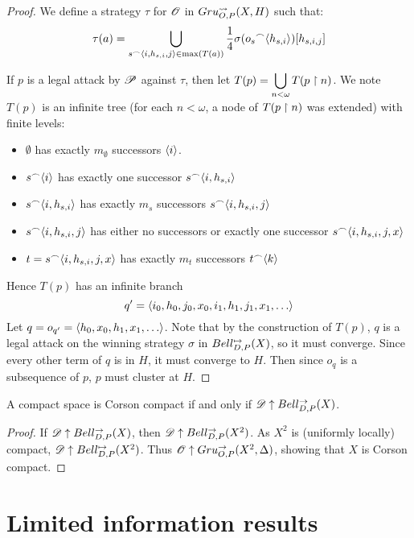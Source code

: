 \begin{proof}
  We define a strategy $\tau$ for $\mathscr{O}$ in $Gru_{O,P}^{\leadsto}(X,H)$ such
  that:
  \[
    \tau(a)
      =
    \bigcup_{s{^\frown}\langle i,h_{s,i},j\rangle\in\max(T(a))}
    \frac{1}{4}\sigma(o_s{^\frown}\langle h_{s,i}\rangle)[h_{s,i,j}]
  \]

  If $p$ is a legal attack by $\mathscr{P}$ against $\tau$, then
  let $\displaystyle T(p)=\bigcup_{n<\omega} T(p\restriction n)$. We note $T(p)$ is an infinite
  tree (for each $n<\omega$, a node of $T(p\restriction n)$ was extended)
  with finite levels:
    \begin{itemize}
      \item $\emptyset$ has exactly $m_\emptyset$ successors $\langle i\rangle$.
      \item $s{^\frown}\langle i\rangle$ has exactly one successor $s{^\frown}\langle i,h_{s,i}\rangle$
      \item $s{^\frown}\langle i,h_{s,i}\rangle$ has exactly $m_s$ successors
            $s{^\frown}\langle i,h_{s,i},j\rangle$
      \item $s{^\frown}\langle i,h_{s,i},j\rangle$ has either no successors or exactly
            one successor $s{^\frown}\langle i,h_{s,i},j,x\rangle$
      \item $t=s{^\frown}\langle i,h_{s,i},j,x\rangle$ has exactly $m_t$ successors
            $t{^\frown}\langle k\rangle$
    \end{itemize}

  Hence $T(p)$ has an infinite branch
    \[
      q'=\<i_0,h_0,j_0,x_0,i_1,h_1,j_1,x_1,\dots\>
    \]
  Let $q=o_{q'}=\<h_0,x_0,h_1,x_1,\dots\>$. Note that by the construction of
  $T(p)$, $q$ is a legal attack on the winning strategy $\sigma$ in
  $Bell_{D,P}^{\mapsto}(X)$, so it must converge. Since every other term of $q$ is
  in $H$, it must converge to $H$. Then since $o_q$ is a subsequence of $p$,
  $p$ must cluster at $H$.
\end{proof}


\begin{cor}
  A compact space is Corson compact if and only if
  $\mathscr{D} \uparrow Bell_{D,P}^{\to}(X)$.
\end{cor}

\begin{proof}
  If $\mathscr{D} \uparrow Bell_{D,P}^{\to}(X)$, then $\mathscr{D} \uparrow Bell_{D,P}^{\to}(X^2)$.
  As $X^2$ is (uniformly locally) compact, $\mathscr{D} \uparrow Bell_{D,P}^{\mapsto}(X^2)$.
  Thus $\mathscr{O}\uparrow Gru_{O,P}^{\to}(X^2,\Delta)$, showing that $X$ is Corson compact.
\end{proof}



\section{Limited information results}

